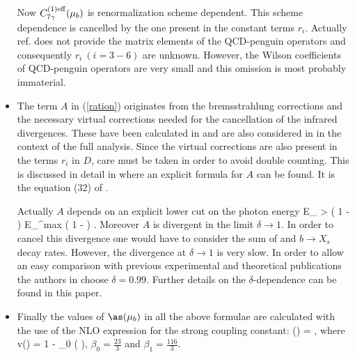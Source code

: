 \begin{itemize}
Now $C^{(1){\rm eff}}_{7\gamma}(\mu_b)$ is renormalization scheme dependent.
This scheme dependence is cancelled by the one present in the
constant terms $r_i$. Actually ref. \cite{GREUB} does not provide
the matrix elements of the QCD-penguin operators and consequently
$r_i~(i=3-6)$ are unknown. However, the Wilson coefficients
of QCD-penguin operators are very small and this omission is 
most probably immaterial.
\item
The term $A$ in (\ref{ration}) originates from the bremsstrahlung
corrections and the necessary virtual corrections needed for the
cancellation of the infrared divergences. These have been
calculated in \cite{AG2,Pott} and are also considered in 
\cite{CZMM,GREUB} in the
context of the full analysis.  Since the virtual corrections
are also present in the terms $r_i$ in $D$, care must be taken
in order to avoid double counting. This is discussed in detail
in \cite{CZMM} where an explicit formula for $A$ can be found.
It is the equation (32) of \cite{CZMM}.

Actually $A$ depends on  an explicit lower cut on the
photon energy 
%
\be\label{phs}
E_{\gamma} > 
( 1 - \delta ) E_{\gamma}^{{\rm max}} \equiv ( 1 - \delta ) .
\ee
Moreover $A$ is divergent in the limit $\delta \to 1$.
In order to cancel this divergence one would have to consider
the sum of \Bsg and $b{\to}X_s$ decay rates.
However, the divergence at $\delta{\to}1$ is very slow. 
In order to
allow an easy comparison with previous experimental and theoretical
publications the authors in \cite{CZMM} choose $\delta = 0.99$.
Further details on the $\delta$-dependence can be found in this paper.
\item
Finally the values of $\as(\mu_b)$ in all the
above formulae are calculated with the use of the NLO expression 
for the strong coupling constant:
%
\be \label{alphaNLL1}
\as(\mu) =  ,
\ee
%
where 
%
\be \label{v(mu1)}
v(\mu) = 1 - \beta_0  
\ln \left(  \right),
\ee
%
$\beta_0 = \frac{23}{3}$ and $\beta_1 = \frac{116}{3}$.
\end{itemize}

